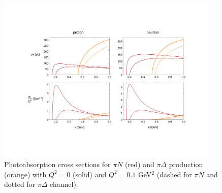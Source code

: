 \documentclass[12pt,preprint,tightenlines,
showpacs,preprintnumbers,amsmath,amssymb,
a4paper,nofootinbib]{revtex4-1}
\begin{document}
\begin{figure}[tbh]
\begin{center} 
\includegraphics[width=0.95\textwidth]{UnpolarizedCrossSections.pdf}
\caption{Photoabsorption cross sections for $\pi N$ (red) and $\pi \Delta$ production (orange) with $Q^2=0$ (solid) and $Q^2=0.1$ GeV$^2$ (dashed for $\pi N$ and dotted for $\pi \Delta$ channel). \label{Fig:SummaryCrossSections}}
\end{center}
\end{figure}
\end{document}
